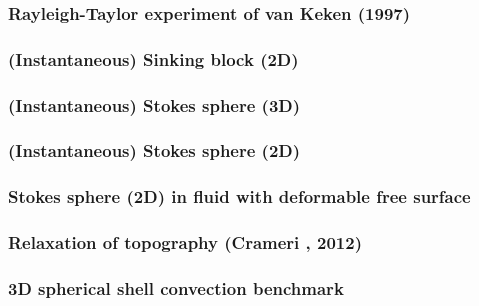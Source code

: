 \newpage
\subsubsection{Rayleigh-Taylor experiment of van Keken \etal (1997)} \label{ss:vaks97}


\newpage
\subsubsection{(Instantaneous) Sinking block (2D)} \label{ss:sinking_block}


\newpage
\subsubsection{(Instantaneous) Stokes sphere (3D)} \label{ss:stokes_sphere3D}


\newpage
\subsubsection{(Instantaneous) Stokes sphere (2D)} \label{ss:stokes_sphere2D}


\newpage
\subsubsection{Stokes sphere (2D) in fluid with deformable free surface} \label{ss:stokes_sphere_fs2D}


\subsubsection{Relaxation of topography (Crameri \etal, 2012)} \label{ss:crsg12}


\subsubsection{3D spherical shell convection benchmark} \label{ss:sscb3D}



